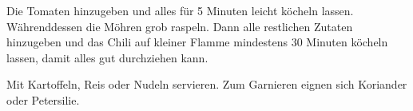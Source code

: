 \begin{recipeDP}
{        \step Die Tomaten hinzugeben und alles für 5 Minuten leicht köcheln lassen.
        Währenddessen die Möhren grob raspeln.
        Dann alle restlichen Zutaten hinzugeben und das Chili auf kleiner Flamme mindestens 30 Minuten köcheln lassen, damit alles gut durchziehen kann.

        \step Mit Kartoffeln, Reis oder Nudeln servieren. Zum Garnieren eignen sich Koriander oder Petersilie.
    }

		


\end{recipeDP}